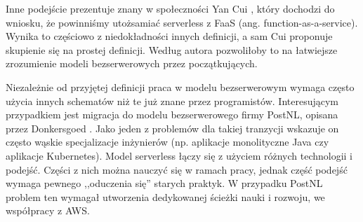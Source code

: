 Inne podejście prezentuje znany w społeczności Yan Cui \cite{cui2024serverless}, który dochodzi do wniosku, że powinniśmy utożsamiać serverless z FaaS (ang. function-as-a-service).
Wynika to częściowo z niedokładności innych definicji, a sam Cui proponuje skupienie się na prostej definicji.
Według autora pozwoliłoby to na łatwiejsze zrozumienie modeli bezserwerowych przez początkujących.

Niezależnie od przyjętej definicji praca w modelu bezserwerowym wymaga często użycia innych schematów niż te już znane przez programistów.
Interesującym przypadkiem jest migracja do modelu bezserwerowego firmy PostNL, opisana przez Donkersgoed \cite{vanDonkersgoed2023postnl}.
Jako jeden z problemów dla takiej tranzycji wskazuje on często wąskie specjalizacje inżynierów (np. aplikacje monolityczne Java czy aplikacje Kubernetes).
Model serverless łączy się z użyciem różnych technologii i podejść.
Części z nich można nauczyć się w ramach pracy, jednak część podejść wymaga pewnego ,,oduczenia się'' starych praktyk.
W przypadku PostNL problem ten wymagał utworzenia dedykowanej ścieżki nauki i rozwoju, we współpracy z AWS.
